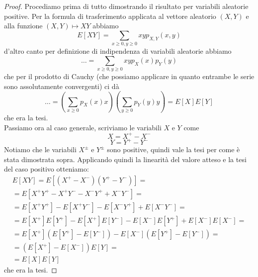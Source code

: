 \documentclass[11pt]{scrartcl}
\begin{document}
	\begin{proof}
		Procediamo prima di tutto dimostrando il risultato per variabili aleatorie positive. 
		Per la formula di trasferimento applicata al vettore aleatorio $(X,Y)$ e alla funzione $(X,Y)\mapsto XY$ abbiamo
		$$E[XY]=\sum_{x\ge 0,y\ge 0}xy p_{X,Y}(x,y)$$
		d'altro canto per definizione di indipendenza di variabili aleatorie abbiamo
		$$\dots=\sum_{x\ge 0,y\ge 0}xy p_X(x)p_Y(y)$$
		che per il prodotto di Cauchy (che possiamo applicare in quanto entrambe le serie sono assolutamente convergenti) ci dà
		$$\dots=\left(\sum_{x\ge 0}p_X(x)x\right)\left(\sum_{y\ge 0}p_Y(y)y \right)=E[X]E[Y]$$
		che era la tesi. \\
		Passiamo ora al caso generale, scriviamo le variabili $X$ e $Y$ come
		$$X=X^+-X^-$$
		$$Y=Y^+-Y^-$$
		Notiamo che le variabili $X^\pm$ e $Y^\pm$ sono positive, quindi vale la tesi per come è stata dimostrata sopra. Applicando quindi la linearità del valore atteso e la tesi del caso positivo otteniamo:
		\begin{align*}
			E[XY]=E\left[\left(X^+-X^-\right)\left(Y^+-Y^-\right)\right]=\\
			=E\left[X^+Y^+-X^+Y^--X^-Y^++X^-Y^-\right]=\\
			=E\left[X^+Y^+\right]-E\left[X^+Y^-\right]-E\left[X^-Y^+\right]+E\left[X^-Y^-\right]=\\
			=E\left[X^+\right]E\left[Y^+\right]-E\left[X^+\right]E\left[Y^-\right]-E\left[X^-\right]E\left[Y^+\right]+E\left[X^-\right]E\left[X^-\right]= \\
			=E\left[X^+\right]\left(E\left[Y^+\right]-E\left[Y^-\right]\right)-E\left[X^-\right]\left(E\left[Y^+\right]-E\left[Y^-\right]\right)= \\
			=\left(E\left[X^+\right]-E\left[X^-\right]\right)E\left[Y\right]= \\
			=E[X]E[Y]
		\end{align*}
		che era la tesi.
	\end{proof}
\end{document}
